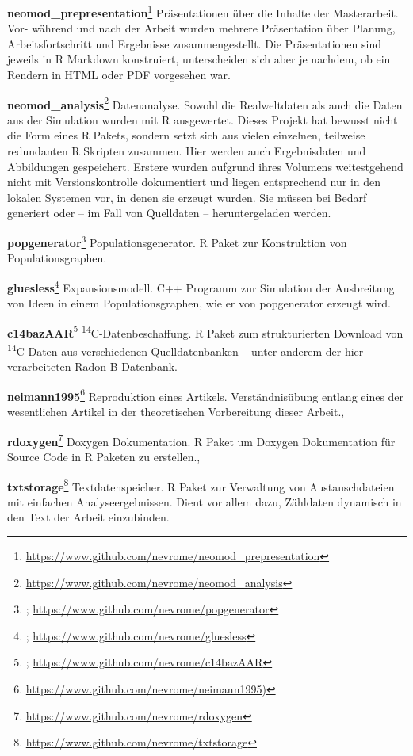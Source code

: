 \documentclass[openany,twoside,twocolumn]{book}
\let\rmarkdownfootnote\footnote%
\def\footnote{\protect\rmarkdownfootnote}
\begin{document}
\textbf{neomod\_prepresentation}\footnote{\url{https://www.github.com/nevrome/neomod_prepresentation}}
Präsentationen über die Inhalte der Masterarbeit. Vor- während und nach
der Arbeit wurden mehrere Präsentation über Planung, Arbeitsfortschritt
und Ergebnisse zusammengestellt. Die Präsentationen sind jeweils in R
Markdown konstruiert, unterscheiden sich aber je nachdem, ob ein Rendern
in HTML oder PDF vorgesehen war.

\textbf{neomod\_analysis}\footnote{\url{https://www.github.com/nevrome/neomod_analysis}}
Datenanalyse. Sowohl die Realweltdaten als auch die Daten aus der
Simulation wurden mit R ausgewertet. Dieses Projekt hat bewusst nicht
die Form eines R Pakets, sondern setzt sich aus vielen einzelnen,
teilweise redundanten R Skripten zusammen. Hier werden auch
Ergebnisdaten und Abbildungen gespeichert. Erstere wurden aufgrund ihres
Volumens weitestgehend nicht mit Versionskontrolle dokumentiert und
liegen entsprechend nur in den lokalen Systemen vor, in denen sie
erzeugt wurden. Sie müssen bei Bedarf generiert oder -- im Fall von
Quelldaten -- heruntergeladen werden.

\textbf{popgenerator}\footnote{\textcite{schmid_popgenerator_2018};
  \url{https://www.github.com/nevrome/popgenerator}}
Populationsgenerator. R Paket zur Konstruktion von Populationsgraphen.

\textbf{gluesless}\footnote{\textcite{clemens_schmid_gluesless_2018};
  \url{https://www.github.com/nevrome/gluesless}} Expansionsmodell. C++
Programm zur Simulation der Ausbreitung von Ideen in einem
Populationsgraphen, wie er von popgenerator erzeugt wird.

\textbf{c14bazAAR}\footnote{\textcite{schmid_c14bazaar_2018};
  \url{https://www.github.com/nevrome/c14bazAAR}}
\textsuperscript{14}C-Datenbeschaffung. R Paket zum strukturierten
Download von \textsuperscript{14}C-Daten aus verschiedenen
Quelldatenbanken -- unter anderem der hier verarbeiteten Radon-B
Datenbank.

\textbf{neimann1995}\footnote{\url{https://www.github.com/nevrome/neimann1995})}
Reproduktion eines Artikels. Verständnisübung entlang eines der
wesentlichen Artikel in der theoretischen Vorbereitung dieser Arbeit.,

\textbf{rdoxygen}\footnote{\url{https://www.github.com/nevrome/rdoxygen}}
Doxygen Dokumentation. R Paket um Doxygen Dokumentation für Source Code
in R Paketen zu erstellen.,

\textbf{txtstorage}\footnote{\url{https://www.github.com/nevrome/txtstorage}}
Textdatenspeicher. R Paket zur Verwaltung von Austauschdateien mit
einfachen Analyseergebnissen. Dient vor allem dazu, Zähldaten dynamisch
in den Text der Arbeit einzubinden.
\end{document}

